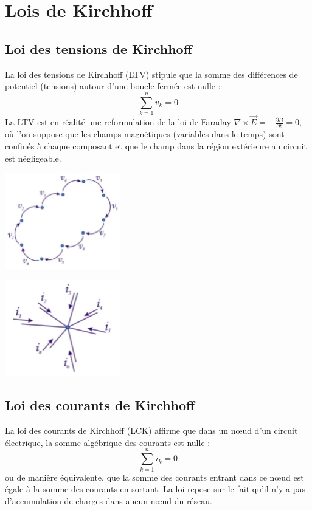 \section{Lois de Kirchhoff}
\subsection{Loi des tensions de Kirchhoff}
La loi des tensions de Kirchhoff (LTV) stipule que la somme des différences de potentiel (tensions) autour d'une boucle fermée est nulle :
\begin{equation}
	\sum_{k=1}^n v_k = 0
	\label{eq:KVL}
\end{equation}
La LTV est en réalité une reformulation de la loi de Faraday $\nabla \times \vec{E} = -\frac{\partial B}{\partial t} = 0$, où l'on suppose que les champs magnétiques (variables dans le temps) sont confinés à chaque composant et que le champ dans la région extérieure au circuit est négligeable.

\begin{minipage}{.5\textwidth}
	\centering
	\includegraphics[width=5cm]{figures/ch00/kvl.jpg}
	\label{fig:kvl}
\end{minipage}
\begin{minipage}{.5\textwidth}
	\centering
	\includegraphics[width=5cm]{figures/ch00/kcl.jpg}
	\label{fig:kcl}
\end{minipage}%

\subsection{Loi des courants de Kirchhoff}
La loi des courants de Kirchhoff (LCK) affirme que dans un nœud d'un circuit électrique, la somme algébrique des courants est nulle :
\begin{equation}
	\sum_{k=1}^n i_k = 0
	\label{eq:KCL}
\end{equation}
ou de manière équivalente, que la somme des courants entrant dans ce nœud est égale à la somme des courants en sortant. La loi repose sur le fait qu'il n'y a pas d'accumulation de charges dans aucun nœud du réseau.

